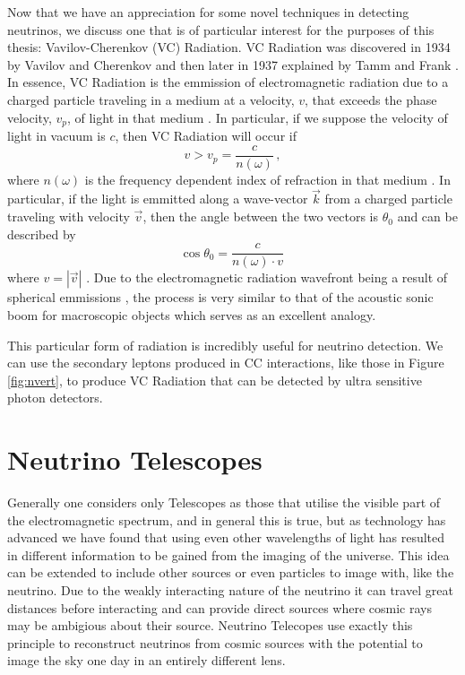 Now that we have an appreciation for some novel techniques in detecting neutrinos, we discuss one that is of particular interest for the purposes of this thesis: Vavilov-Cherenkov (VC) Radiation. VC Radiation was discovered in 1934 by Vavilov \cite{vav_og} and Cherenkov \cite{cher_og} and then later in 1937 explained by Tamm and Frank \cite{tamm}. In essence, VC Radiation is the emmission of electromagnetic radiation due to a charged particle traveling in a medium at a velocity, $v$, that exceeds the phase velocity, $v_{p}$, of light in that medium \cite{ginz}. In particular, if we suppose the velocity of light in vacuum is $c$, then VC Radiation will occur if
\begin{equation}
  v > v_{p} = \frac{c}{n(\omega)}\, ,
\end{equation}
where $n(\omega)$ is the frequency dependent index of refraction in that medium \cite{ginz}. In particular, if the light is emmitted along a wave-vector $\vec{k}$ from a charged particle traveling with velocity $\vec{v}$, then the angle between the two vectors is $\theta_{0}$ and can be described by
\begin{equation}
  \cos\theta_{0} = \frac{c}{n(\omega)\cdot v}\,
\end{equation}
where $v = |\vec{v}|$ \cite{ginz}. Due to the electromagnetic radiation wavefront being a result of spherical emmissions \cite{ginz}, the process is very similar to that of the acoustic sonic boom for macroscopic objects \cite{ginz} which serves as an excellent analogy.

This particular form of radiation is incredibly useful for neutrino detection. We can use the secondary leptons produced in CC interactions, like those in Figure \ref{fig:nvert}, to produce VC Radiation that can be detected by ultra sensitive photon detectors. 

\section{Neutrino Telescopes}

Generally one considers only Telescopes as those that utilise the visible part of the electromagnetic spectrum, and in general this is true, but as technology has advanced we have found that using even other wavelengths of light has resulted in different information to be gained from the imaging of the universe. This idea can be extended to include other sources or even particles to image with, like the neutrino. Due to the weakly interacting nature of the neutrino it can travel great distances before interacting and can provide direct sources where cosmic rays may be ambigious about their source. Neutrino Telecopes use exactly this principle to reconstruct neutrinos from cosmic sources with the potential to image the sky one day in an entirely different lens.

